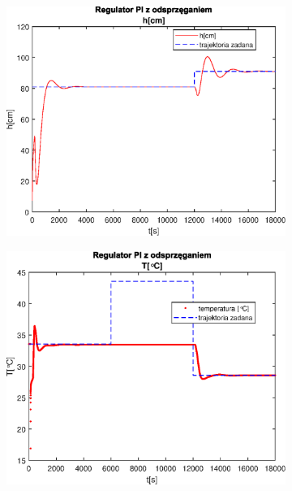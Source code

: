 \begin{figure}[h!]
   \centering
   \begin{subfigure}[b]{0.4\textwidth}
      \includegraphics[width=1\linewidth]{img/PI/decoupler/PIDecouplerH1.eps}
      \caption{}
      \label{fig:fig:stepResponsesFh11}
   \end{subfigure}
       
   \begin{subfigure}[b]{0.4\textwidth}
      \includegraphics[width=1\linewidth]{img/PI/decoupler/PIDecouplerT1.eps}
      \caption{}
      \label{fig:fig:stepResponsesFh12}
   \end{subfigure}
       

\end{figure}

